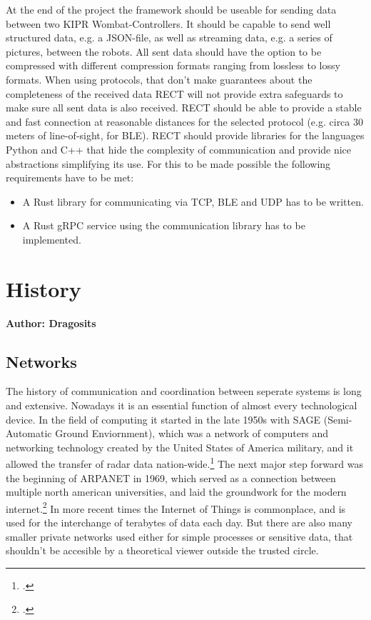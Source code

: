 At the end of the project the framework should be useable for sending data between two KIPR Wombat-Controllers. It should be capable
to send well structured data, e.g. a JSON-file, as well as streaming data, e.g. a series of pictures, between the robots. All sent data should have the
option to be compressed with different compression formats ranging from lossless to lossy formats. When using protocols, that don't make guarantees about
the completeness of the received data RECT will not provide extra safeguards to make sure all sent data is also received.
RECT should be able to provide a stable and fast connection at reasonable distances for the selected protocol (e.g. circa 30 meters of line-of-sight, for BLE).
RECT should provide libraries for the languages Python and C++ that hide the complexity of communication and provide nice abstractions simplifying its use.
For this to be made possible the following requirements have to be met:
\begin{itemize}
\item A Rust library for communicating via TCP, BLE and UDP has to be written.
\item A Rust gRPC service using the communication library has to be implemented.
\end{itemize}

\section{History}
\textbf{Author: Dragosits}
\subsection{Networks}
The history of communication and coordination between seperate systems is long and extensive. Nowadays it is an essential 
function of almost every technological device. In the field of computing it started in the late 1950s with SAGE (Semi-Automatic Ground Enviornment),
which was a network of computers and networking technology created by the United States of America military, 
and it allowed the transfer of radar data nation-wide.\footcite[][89]{A_New_History_of_Modern_Computing}
The next major step forward was the beginning of ARPANET in 1969, which served as a connection between multiple north american 
universities, and laid the groundwork for the modern internet.\footcite[][25]{How_the_web_was_born}
In more recent times the Internet of Things is commonplace, and is used for the interchange of terabytes of data each day. 
But there are also many smaller private networks used either for simple processes or sensitive data, that shouldn't be 
accesible by a theoretical viewer outside the trusted circle. 


